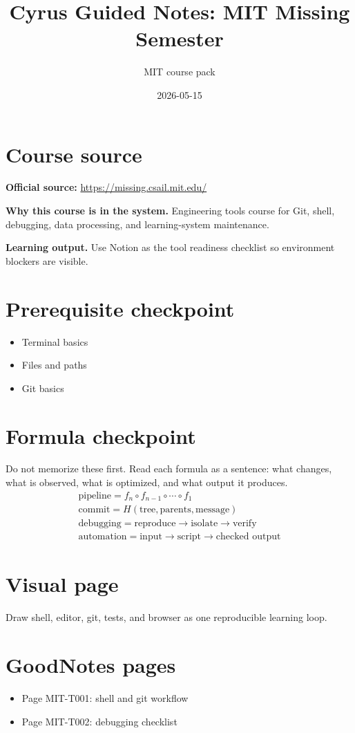 \documentclass[11pt]{article}
\title{Cyrus Guided Notes: MIT Missing Semester}
\author{MIT course pack}
\date{2026-05-15}
\begin{document}
\maketitle

\section*{Course source}
\textbf{Official source:} \url{https://missing.csail.mit.edu/}

\textbf{Why this course is in the system.} Engineering tools course for Git, shell, debugging, data processing, and learning-system maintenance.

\textbf{Learning output.} Use Notion as the tool readiness checklist so environment blockers are visible.

\section*{Prerequisite checkpoint}
\begin{itemize}[leftmargin=1.4em]
  \item Terminal basics
  \item Files and paths
  \item Git basics
\end{itemize}

\section*{Formula checkpoint}
Do not memorize these first. Read each formula as a sentence: what changes, what is observed, what is optimized, and what output it produces.
\begin{align*}
  \text{pipeline}=f_n\circ f_{n-1}\circ\cdots\circ f_1\\
  \text{commit}=H(\text{tree},\text{parents},\text{message})\\
  \text{debugging}=\text{reproduce}\rightarrow\text{isolate}\rightarrow\text{verify}\\
  \text{automation}=\text{input}\rightarrow\text{script}\rightarrow\text{checked output}
\end{align*}

\section*{Visual page}
Draw shell, editor, git, tests, and browser as one reproducible learning loop.

\section*{GoodNotes pages}
\begin{itemize}[leftmargin=1.4em]
  \item Page MIT-T001: shell and git workflow
  \item Page MIT-T002: debugging checklist
\end{itemize}
\end{document}
